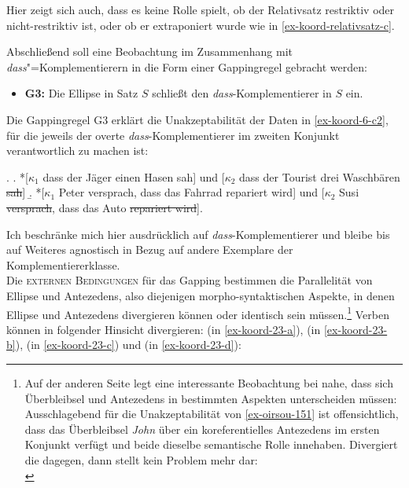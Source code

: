 Hier zeigt sich auch, dass es keine Rolle spielt, ob der Relativsatz restriktiv oder nicht-restriktiv ist, oder ob er extraponiert wurde wie in \ref{ex-koord-relativsatz-c}. 

Abschlie\ss end soll eine Beobachtung im Zusammenhang mit \emph{dass}"=Komplementierern in die Form einer Gappingregel gebracht werden:    
\begin{itemize}  
  \item[] {\bf G3:} Die Ellipse in Satz $S$ schlie\ss t den \emph{dass}-Komplementierer in $S$ ein.
\end{itemize}
Die Gappingregel G3 erklärt die Unakzeptabilität der Daten in \ref{ex-koord-6-c2}, für die jeweils der overte \emph{dass}-Komplementierer im zweiten Konjunkt verantwortlich zu machen ist:  

\ex. \label{ex-koord-6-c2}
\a. *[$\kappa_1$ dass der Jäger einen Hasen sah] und [$\kappa_2$ dass der Tourist drei Waschbären \sout{sah}]\label{ex-koord-6-c2-a}
\b. *[$\kappa_1$ Peter versprach, dass das Fahrrad repariert wird] und [$\kappa_2$ Susi \sout{versprach}, dass das Auto \sout{repariert wird}].\label{ex-koord-6-c2-b} 

Ich beschränke mich hier ausdrücklich auf \emph{dass}-Komplementierer und bleibe bis auf Weiteres agnostisch in Bezug auf andere Exemplare der Komplementiererklasse. \\


Die \textsc{externen Bedingungen} \label{sec-ext-bedingungen} für das Gapping bestimmen die Parallelität von Ellipse und Antezedens, also diejenigen morpho-syntaktischen Aspekte, in denen Ellipse und Antezedens divergieren können oder identisch sein müssen.\footnote{Auf der anderen Seite legt eine interessante Beobachtung bei \cite{Oirsouw:87} nahe, dass sich Überbleibsel und Antezedens in bestimmten Aspekten unterscheiden müssen:\\
Ausschlagebend für die Unakzeptabilität von \ref{ex-oirsou-151} ist offensichtlich, dass das Überbleibsel {\it John} über ein koreferentielles Antezedens im ersten Konjunkt verfügt und beide dieselbe semantische Rolle innehaben. Divergiert die  dagegen, dann stellt  kein Problem mehr dar:\\  
} Verben können in folgender Hinsicht divergieren:  (in \ref{ex-koord-23-a}),  (in \ref{ex-koord-23-b}),  (in \ref{ex-koord-23-c}) und  (in \ref{ex-koord-23-d}):

